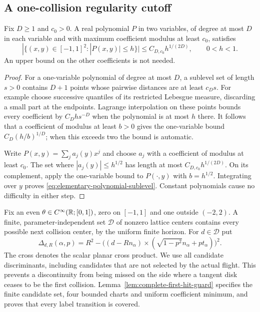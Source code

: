 \subsection{A one-collision regularity cutoff}
\begin{lemma}
\label{lem:elementary-polynomial-sublevel}
Fix $D\ge1$ and $c_0>0$. A real polynomial $P$ in two variables, of
degree at most $D$ in each variable and with maximum coefficient
modulus at least $c_0$, satisfies
\begin{equation}\label{eq:elementary-polynomial-sublevel}
 |\{(x,y)\in[-1,1]^2:|P(x,y)|\le h\}|
                  \le C_{D,c_0}h^{1/(2D)},\qquad 0<h<1.
\end{equation}
An upper bound on the other coefficients is not needed.
\end{lemma}
\begin{proof}
For a one-variable polynomial of degree at most $D$, a sublevel set of
length $s>0$ contains $D+1$ points whose pairwise distances are at least
$c_Ds$. For example choose successive quantiles of its restricted
Lebesgue measure, discarding a small part at the endpoints. Lagrange
interpolation on these points bounds every coefficient by $C_D h s^{-D}$
when the polynomial is at most $h$ there. It follows that a coefficient
of modulus at least $b>0$ gives the one-variable bound
$C_D(h/b)^{1/D}$; when this exceeds two the bound is automatic.

Write $P(x,y)=\sum_j a_j(y)x^j$ and choose $a_j$ with a coefficient
of modulus at least $c_0$. The set where $|a_j(y)|\le h^{1/2}$ has
length at most $C_{D,c_0}h^{1/(2D)}$. On its complement, apply the
one-variable bound to $P(\cdot,y)$ with $b=h^{1/2}$. Integrating over
$y$ proves \eqref{eq:elementary-polynomial-sublevel}. Constant
polynomials cause no difficulty in either step.
\end{proof}

Fix an even $\theta\in C^\infty(\mathbb R;[0,1])$, zero on $[-1,1]$ and one
outside $(-2,2)$. A finite, parameter-independent set $\mathcal D$ of
nonzero lattice centers contains every possible next collision center,
by the uniform finite horizon. For $d\in\mathcal D$ put
\begin{equation}\label{eq:all-candidate-discriminants}
 \Delta_{d,R}(\alpha,p)
   =R^2-\bigl((d-Rn_\alpha)\mathbin{\times}
          (\sqrt{1-p^2}n_\alpha+pt_\alpha)\bigr)^2.
\end{equation}
The cross denotes the scalar planar cross product. We use all candidate
discriminants, including candidates that are not selected by the actual
flight. This prevents a discontinuity from being missed on the side
where a tangent disk ceases to be the first collision.
Lemma~\ref{lem:complete-first-hit-guard} specifies the finite candidate
set, four bounded charts and uniform coefficient minimum, and proves
that every label transition is covered.

